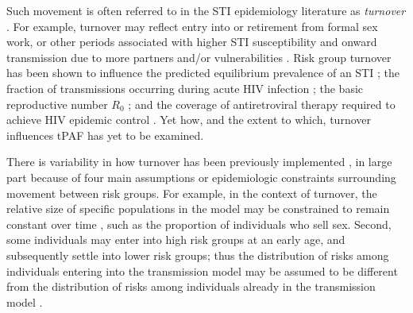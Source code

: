 Such movement is often referred to in the STI epidemiology literature as
\textit{turnover} \citep{Watts2010}.
For example, turnover may reflect entry into or retirement from formal sex work,
or other periods associated with higher STI susceptibility and onward transmission
due to more partners and/or vulnerabilities
\citep{Marston2006,Watts2010}.
Risk group turnover has been shown to
influence the predicted equilibrium prevalence of an STI \citep{Stigum1994,Zhang2012};
the fraction of transmissions occurring during acute HIV infection \citep{Zhang2012};
the basic reproductive number $R_0$ \citep{Henry2015}; and
the coverage of antiretroviral therapy required to achieve HIV epidemic control \citep{Henry2015}.
Yet how, and the extent to which, turnover influences tPAF has yet to be examined.
\par
There is variability in how turnover has been previously implemented
\citep{Stigum1994,Koopman1997,Eaton2014,Boily2015},
in large part because of four main assumptions or epidemiologic
constraints surrounding movement between risk groups.
For example, in the context of turnover, the relative 
size of specific populations in the model 
may be constrained to remain constant over time
\citep{Stigum1994,Koopman1997,Eaton2014},
such as the proportion of individuals who sell sex.
Second, some individuals may enter into high risk groups at an early age,
and subsequently settle into lower risk groups;
thus the distribution of risks among individuals entering into the transmission model
may be assumed to be different from
the distribution of risks among individuals already in the transmission model
\citep{Eaton2014}.

